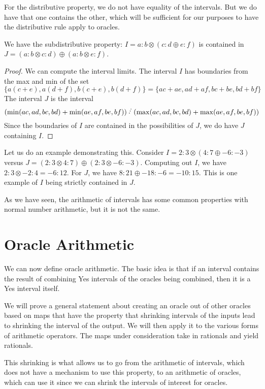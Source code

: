 \documentclass[12pt]{article}
\begin{document}
For the distributive property, we do not have equality of the intervals. But we do have that one contains the other, which will be sufficient for our purposes to have the distributive rule apply to oracles. 

\begin{proposition}
We have the subdistributive property: $I = a:b\otimes(c:d \oplus e:f)$ is contained in $J = (a:b \otimes c:d) \oplus (a:b \otimes e:f)$. 
\end{proposition}

\begin{proof}
We can compute the interval limits. The interval $I$ has boundaries from the max and min of the set 
\[
\{a(c+e), a(d+f), b(c+e), b(d+f)\} = \{ac+ae, ad+af, bc+be, bd+bf\}
\] 
The interval $J$ is the interval 
\[
(\min(ac, ad, bc, bd) + \min(ae, af, be, bf) ) \lte (\max(ac, ad, bc, bd) + \max(ae, af, be, bf) )
\]
Since the boundaries of $I$ are contained in the possibilities of $J$, we do have $J$ containing $I$.
\end{proof}

Let us do an example demonstrating this. Consider $I = 2:3 \otimes ( 4:7 \oplus -6:-3)$ versus $J = (2:3 \otimes 4:7) \oplus (2:3 \otimes -6:-3)$. Computing out $I$, we have $2:3 \otimes -2:4 = -6:12$. For $J$, we have $8:21 \oplus -18:-6 = -10: 15$. This is one example of $I$ being strictly contained in $J$. 

As we have seen, the arithmetic of intervals has some common properties with normal number arithmetic, but it is not the same.

\section{Oracle Arithmetic}

We can now define oracle arithmetic. The basic idea is that if an interval contains the result of combining Yes intervals of the oracles being combined, then it is a Yes interval itself. 

We will prove a general statement about creating an oracle out of other oracles based on maps that have the property that shrinking intervals of the inputs lead to shrinking the interval of the output. We will then apply it to the various forms of arithmetic operators. The maps under consideration take in rationals and yield rationals. 

This shrinking is what allows us to go from the arithmetic of intervals, which does not have a mechanism to use this property, to an arithmetic of oracles, which can use it since we can shrink the intervals of interest for oracles. 
\end{document}
